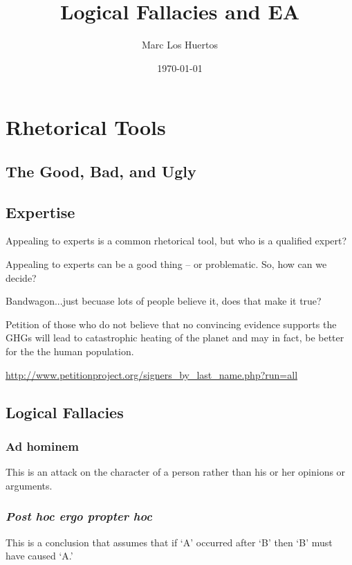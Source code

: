 \documentclass{article}\usepackage[]{graphicx}\usepackage[]{color}
\title{Logical Fallacies and EA}
\author{Marc Los Huertos}
\date{\today}
\begin{document}
\maketitle

\section{Rhetorical Tools}

\subsection{The Good, Bad, and Ugly}



\subsection{Expertise}

Appealing to experts is a common rhetorical tool, but who is a qualified expert?

Appealing to experts can be a good thing -- or problematic. So, how can we decide?

Bandwagon...just becuase lots of people believe it, does that make it true?

Petition of those who do not believe that no convincing evidence supports the GHGs will lead to catastrophic heating of the planet and may in fact, be better for the the human population. 

\url{http://www.petitionproject.org/signers_by_last_name.php?run=all}

\subsection{Logical Fallacies}

\subsubsection{Ad hominem}

This is an attack on the character of a person rather than his or her opinions or arguments.

\subsubsection{\emph{Post hoc ergo propter hoc}}

This is a conclusion that assumes that if `A' occurred after `B' then `B' must have caused `A.'
\end{document}
